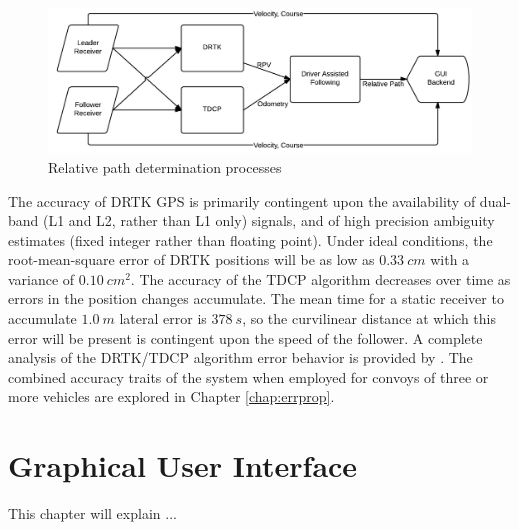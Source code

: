 \documentclass[12pt]{report}
\begin{document}
\begin{figure}[htbp]
    \centering
    \includegraphics[width=6.5in]{./figs/data_algo.png}
    \caption{Relative path determination processes}
    \label{fig:drtktdcp}
\end{figure}

The accuracy of DRTK GPS is primarily contingent upon the availability of dual-band (L1 and L2, rather than L1 only) signals, and of high precision ambiguity estimates (fixed integer rather than floating point). Under ideal conditions, the root-mean-square error of DRTK positions will be as low as $0.33~cm$ with a variance of $0.10~cm^2$. 
The accuracy of the TDCP algorithm decreases over time as errors in the position changes accumulate. The mean time for a static receiver to accumulate $1.0~m$ lateral error is $378~s$, so the curvilinear distance at which this error will be present is contingent upon the speed of the follower. A complete analysis of the DRTK/TDCP algorithm error behavior is provided by \cite{scottthesis}. The combined accuracy traits of the system when employed for convoys of three or more vehicles are explored in Chapter \ref{chap:errprop}.


\chapter{Graphical User Interface}

This chapter will explain ...

\end{document}
